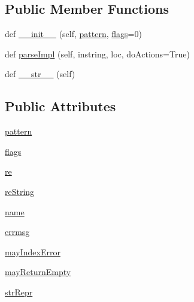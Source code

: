 \subsection*{Public Member Functions}
\begin{DoxyCompactItemize}
\item 
def \hyperlink{classsetuptools_1_1__vendor_1_1pyparsing_1_1Regex_a2bf2a91eb8c1faa95c32ec015dfe6a2a}{\+\_\+\+\_\+init\+\_\+\+\_\+} (self, \hyperlink{classsetuptools_1_1__vendor_1_1pyparsing_1_1Regex_ac44432e0bd93d9235644ae1a488f6d5a}{pattern}, \hyperlink{classsetuptools_1_1__vendor_1_1pyparsing_1_1Regex_a50a3cddfb3e779a8dc26df03146ee3ec}{flags}=0)
\item 
def \hyperlink{classsetuptools_1_1__vendor_1_1pyparsing_1_1Regex_a718eded9f697312aab4748ee7dddcd39}{parse\+Impl} (self, instring, loc, do\+Actions=True)
\item 
def \hyperlink{classsetuptools_1_1__vendor_1_1pyparsing_1_1Regex_a2c416a74248d2cf168b3914bd15658e0}{\+\_\+\+\_\+str\+\_\+\+\_\+} (self)
\end{DoxyCompactItemize}
\subsection*{Public Attributes}
\begin{DoxyCompactItemize}
\item 
\hyperlink{classsetuptools_1_1__vendor_1_1pyparsing_1_1Regex_ac44432e0bd93d9235644ae1a488f6d5a}{pattern}
\item 
\hyperlink{classsetuptools_1_1__vendor_1_1pyparsing_1_1Regex_a50a3cddfb3e779a8dc26df03146ee3ec}{flags}
\item 
\hyperlink{classsetuptools_1_1__vendor_1_1pyparsing_1_1Regex_ac66edd278761d8c7cea7282588ed5124}{re}
\item 
\hyperlink{classsetuptools_1_1__vendor_1_1pyparsing_1_1Regex_a5c8c745772a9ae3dba51c6d1c1657d3e}{re\+String}
\item 
\hyperlink{classsetuptools_1_1__vendor_1_1pyparsing_1_1Regex_a37dfb9b4ea640ed9aea184fad06494b9}{name}
\item 
\hyperlink{classsetuptools_1_1__vendor_1_1pyparsing_1_1Regex_af46a05001880dc9e7e854bd1759d7d7a}{errmsg}
\item 
\hyperlink{classsetuptools_1_1__vendor_1_1pyparsing_1_1Regex_a7ab161748256970461a75c80e51d08d0}{may\+Index\+Error}
\item 
\hyperlink{classsetuptools_1_1__vendor_1_1pyparsing_1_1Regex_a6a416c5ca68222a542563ef1f6e3eafb}{may\+Return\+Empty}
\item 
\hyperlink{classsetuptools_1_1__vendor_1_1pyparsing_1_1Regex_ae3a388221abaafcd882e9dbd0b396af9}{str\+Repr}
\end{DoxyCompactItemize}
